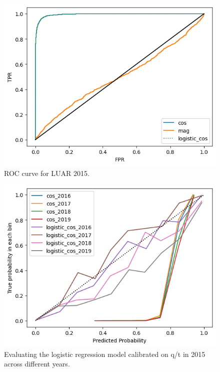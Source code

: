 \begin{figure}
    \centering
    \includegraphics[width=0.5\linewidth]{stylometryExtensions/figures/calibration_expts/roc_2015.png}
    \caption{ROC curve for LUAR 2015.}
    \label{fig:calibration:roc_2015}
\end{figure}


\begin{figure}
    \centering
    \includegraphics[width=0.5\linewidth]{stylometryExtensions/figures/calibration_expts/eval_calibration.png}
    \caption{Evaluating the logistic regression model calibrated on q/t in 2015 across different years.}
    \label{fig:calibration:reliability_2016_2019}
\end{figure}

